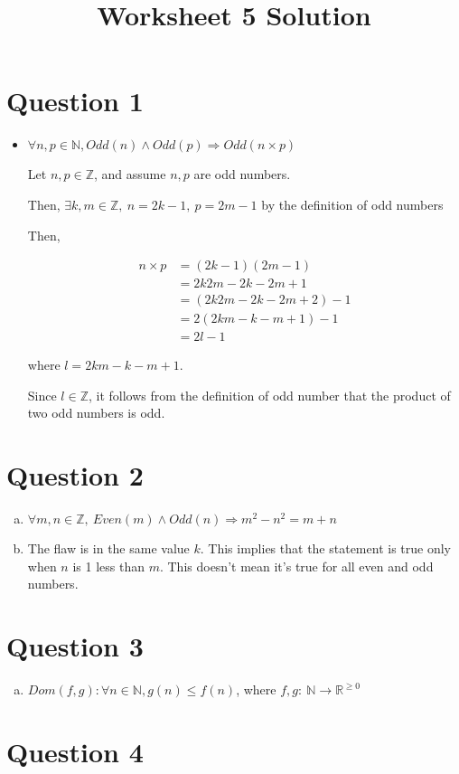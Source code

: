 \documentclass[12pt]{article}
\begin{document}
\title{Worksheet 5 Solution}
\maketitle

\section*{Question 1}
\begin{itemize}
    \item

    $\forall n,p \in \mathbb{N}, Odd(n) \land Odd(p) \Rightarrow Odd(n \times p)$

    \bigskip

    Let $n,p \in \mathbb{Z}$, and assume $n,p$ are odd numbers.

    \bigskip

    Then, $\exists k,m \in \mathbb{Z},\:n = 2k - 1,\: p = 2m -1$ by the definition of
    odd numbers

    \bigskip

    Then,

    \begin{align}
        n \times p &= (2k-1)(2m-1)\\
        &= 2k2m - 2k - 2m + 1 \\
        &=(2k2m - 2k - 2m + 2) - 1 \\
        &=2(2km - k - m + 1) - 1\\
        &=2l - 1
    \end{align}

    where $l = 2km - k - m + 1$.

    \bigskip

    Since $l \in \mathbb{Z}$, it follows from the definition of odd number that the product
    of two odd numbers is odd.

\end{itemize}

\section*{Question 2}

\begin{enumerate}[a.]
    \item

    $\forall m,n \in \mathbb{Z},\:Even(m) \land Odd(n) \Rightarrow m^2-n^2 = m + n$

    \item

    The flaw is in the same value $k$. This implies that the statement is true
    only when $n$ is 1 less than $m$. This doesn't mean it's true for all even and
    odd numbers.


\end{enumerate}

\section*{Question 3}
\begin{enumerate}[a.]
    \item

    $Dom(f,g):\forall n \in \mathbb{N}, g(n) \leq f(n)$, where $f,g:\:\mathbb{N} \to \mathbb{R}^{\geq0}$

\end{enumerate}

\section*{Question 4}
\end{document}
